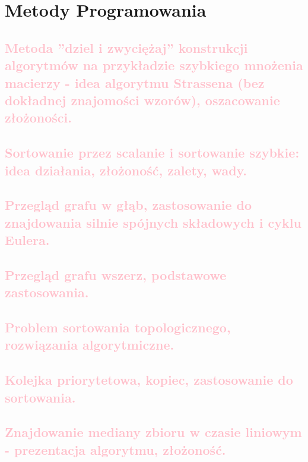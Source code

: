 \chapter{Metody Programowania}

\section{\textcolor{pink}{Metoda ”dziel i zwyciężaj” konstrukcji algorytmów na przykładzie szybkiego mnożenia macierzy - idea algorytmu Strassena (bez dokładnej znajomości wzorów), oszacowanie
złożoności.}}

\section{\textcolor{pink}{Sortowanie przez scalanie i sortowanie szybkie: idea działania, złożoność, zalety, wady.}}

\section{\textcolor{pink}{Przegląd grafu w głąb, zastosowanie do znajdowania silnie spójnych składowych i cyklu Eulera.}}

\section{\textcolor{pink}{Przegląd grafu wszerz, podstawowe zastosowania.}}

\section{\textcolor{pink}{Problem sortowania topologicznego, rozwiązania algorytmiczne.}}

\section{\textcolor{pink}{Kolejka priorytetowa, kopiec, zastosowanie do sortowania.}}

\section{\textcolor{pink}{Znajdowanie mediany zbioru w czasie liniowym - prezentacja algorytmu, złożoność.}}